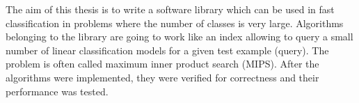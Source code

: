 The aim of this thesis is to write a software library which can be used in fast classification in problems where the number of classes is very large.
Algorithms belonging to the library are going to work like an index allowing to query a small number of linear classification models for a given test example (query).
The problem is often called maximum inner product search (MIPS).
After the algorithms were implemented, they were verified for correctness and their performance was tested.
